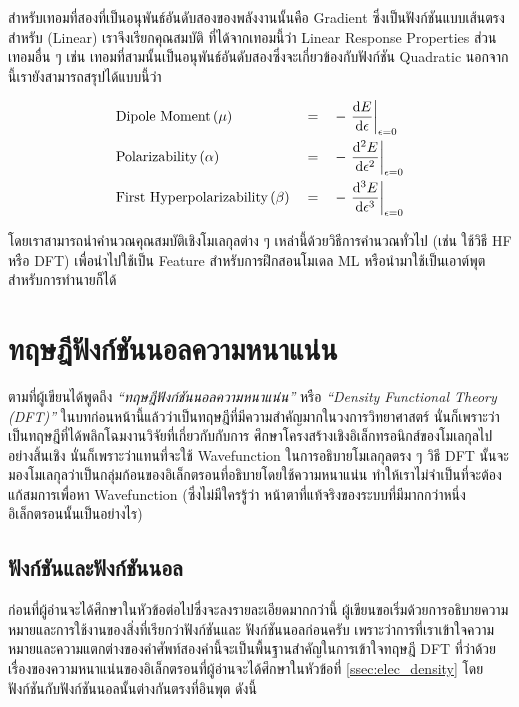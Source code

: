 \noindent สำหรับเทอมที่สองที่เป็นอนุพันธ์อันดับสองของพลังงานนั้นคือ Gradient ซึ่งเป็นฟังก์ชันแบบเส้นตรงสำหรับ (Linear) เราจึงเรียกคุณสมบัติ%
ที่ได้จากเทอมนี้ว่า Linear Response Properties ส่วนเทอมอื่น ๆ เช่น เทอมที่สามนั้นเป็นอนุพันธ์อันดับสองซึ่งจะเกี่ยวข้องกับฟังก์ชัน Quadratic  
นอกจากนี้เรายังสามารถสรุปได้แบบนี้ว่า

\begin{align*}
    &\text{Dipole Moment}\,(\mu) &&= &&-\evaluated{\dv{E}{\epsilon}}_{\epsilon = 0} \\
    &\text{Polarizability}\,(\alpha) &&= &&-\evaluated{\dv[2]{E}{\epsilon}}_{\epsilon = 0} \\
    &\text{First Hyperpolarizability}\,(\beta) &&= &&-\evaluated{\dv[3]{E}{\epsilon}}_{\epsilon = 0}
\end{align*}

โดยเราสามารถนำคำนวณคุณสมบัติเชิงโมเลกุลต่าง ๆ เหล่านี้ด้วยวิธีการคำนวณทั่วไป (เช่น ใช้วิธี HF หรือ DFT) เพื่อนำไปใช้เป็น Feature 
สำหรับการฝึกสอนโมเดล ML หรือนำมาใช้เป็นเอาต์พุตสำหรับการทำนายก็ได้

\section{ทฤษฎีฟังก์ชันนอลความหนาแน่น}
\label{sec:dft}

ตามที่ผู้เขียนได้พูดถึง \textit{\enquote{ทฤษฎีฟังก์ชันนอลความหนาแน่น}} หรือ \textit{\enquote{Density Functional Theory 
(DFT)}} ในบทก่อนหน้านี้แล้วว่าเป็นทฤษฎีที่มีความสำคัญมากในวงการวิทยาศาสตร์ นั่นก็เพราะว่าเป็นทฤษฎีที่ได้พลิกโฉมงานวิจัยที่เกี่ยวกับกับการ%
ศึกษาโครงสร้างเชิงอิเล็กทรอนิกส์ของโมเลกุลไปอย่างสิ้นเชิง นั่นก็เพราะว่าแทนที่จะใช้ Wavefunction ในการอธิบายโมเลกุลตรง ๆ วิธี DFT นั้นจะ%
มองโมเลกุลว่าเป็นกลุ่มก้อนของอิเล็กตรอนที่อธิบายโดยใช้ความหนาแน่น ทำให้เราไม่จำเป็นที่จะต้องแก้สมการเพื่อหา Wavefunction (ซึ่งไม่มีใครรู้ว่า%
หน้าตาที่แท้จริงของระบบที่มีมากกว่าหนึ่งอิเล็กตรอนนั้นเป็นอย่างไร)

\subsection{ฟังก์ชันและฟังก์ชันนอล}
\label{ssec:function_functional}

ก่อนที่ผู้อ่านจะได้ศึกษาในหัวข้อต่อไปซึ่งจะลงรายละเอียดมากกว่านี้ ผู้เขียนขอเริ่มด้วยการอธิบายความหมายและการใช้งานของสิ่งที่เรียกว่าฟังก์ชันและ%
ฟังก์ชันนอลก่อนครับ เพราะว่าการที่เราเข้าใจความหมายและความแตกต่างของคำศัพท์สองคำนี้จะเป็นพื้นฐานสำคัญในการเข้าใจทฤษฎี DFT ที่ว่าด้วย%
เรื่องของความหนาแน่นของอิเล็กตรอนที่ผู้อ่านจะได้ศึกษาในหัวข้อที่ \ref{ssec:elec_density} โดยฟังก์ชันกับฟังก์ชันนอลนั้นต่างกันตรงที่อินพุต 
ดังนี้

